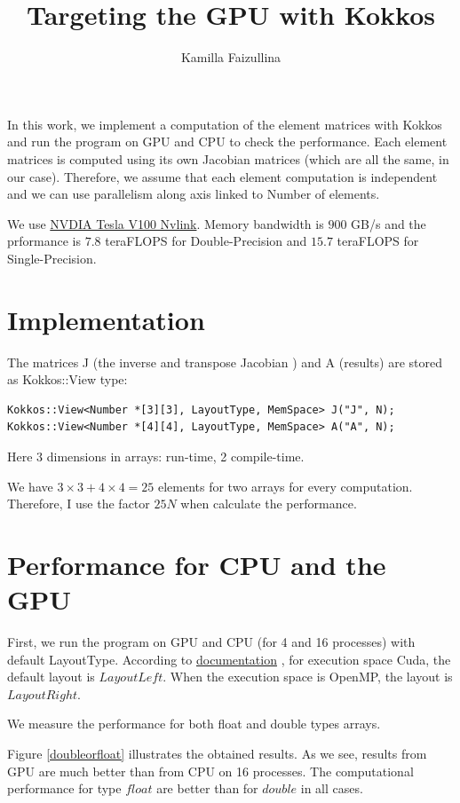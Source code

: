 \documentclass{article}
\title{Targeting the GPU with Kokkos}
\author{ Kamilla Faizullina}
\date{\empty}
\begin{document}
\maketitle
In this work, we implement a computation of the element matrices  with Kokkos and run the program on GPU and CPU to check the performance. Each element matrices is computed using its own Jacobian matrices (which are all the same, in our case). Therefore, we assume that each element computation is independent and we can use parallelism along axis linked to Number of elements. 

We use \href{https://www.nvidia.com/en-us/data-center/v100/}{NVDIA Tesla V100 Nvlink}. Memory bandwidth is  $900$ GB/s and the prformance is $7.8$  teraFLOPS for Double-Precision and $15.7$ teraFLOPS for Single-Precision.

 

\section{Implementation}
The matrices J (the inverse and transpose Jacobian ) and A (results) are stored as Kokkos::View type:

\begin{verbatim}
Kokkos::View<Number *[3][3], LayoutType, MemSpace> J("J", N);
Kokkos::View<Number *[4][4], LayoutType, MemSpace> A("A", N);
\end{verbatim}
Here $3$ dimensions in arrays: run-time, 2 compile-time.

We have $3\times3 + 4\times 4 = 25$ elements for two arrays for every computation. Therefore, I use the factor $25 N$ when calculate the performance.  

\section{ Performance for CPU and the GPU }
First, we run the program on GPU and CPU (for 4 and 16 processes) with default LayoutType. According to   \href{https://github-wiki-see.page/m/kokkos/kokkos/wiki/View}{documentation} , for execution space Cuda, the default layout is $LayoutLeft$. When the execution space is OpenMP, the layout is $LayoutRight$.

We measure the performance for both float and double types arrays.

Figure \ref{doubleorfloat} illustrates the obtained results. As we see, results from GPU are much better than from CPU on 16 processes. The computational performance for type $float$ are better than for $double$ in all cases. 
\end{document}
